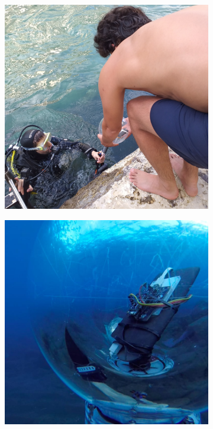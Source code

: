 \begin{figure}[!h]
    \centering
    \begin{subfigure}{0.3\textwidth}
        \centering
        \includegraphics[width=1\textwidth]{figures/underwater_2.jpg}
        \caption{  }
        \label{fig:underwater}
    \end{subfigure}
    \begin{subfigure}{0.3\textwidth}
        \centering
        \includegraphics[width=1\textwidth]{figures/underwater_3.jpg}

\end{subfigure}
\end{figure}
